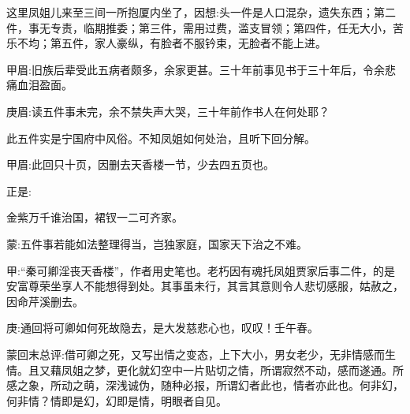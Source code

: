 \begin{parag}
    这里凤姐儿来至三间一所抱厦内坐了，因想:头一件是人口混杂，遗失东西；第二件，事无专责，临期推委；第三件，需用过费，滥支冒领；第四件，任无大小，苦乐不均；第五件，家人豪纵，有脸者不服钤束，无脸者不能上进。\begin{note}甲眉:旧族后辈受此五病者颇多，余家更甚。三十年前事见书于三十年后，令余悲痛血泪盈面。\end{note}\begin{note}庚眉:读五件事未完，余不禁失声大哭，三十年前作书人在何处耶？\end{note}此五件实是宁国府中风俗。不知凤姐如何处治，且听下回分解。\begin{note}甲眉:此回只十页，因删去天香楼一节，少去四五页也。\end{note}
\end{parag}


\begin{parag}
    正是:
\end{parag}


\begin{poem}
    \begin{pl} 金紫万千谁治国，裙钗一二可齐家。\end{pl}
    \begin{note}蒙:五件事若能如法整理得当，岂独家庭，国家天下治之不难。\end{note}
\end{poem}


\begin{parag}
    \begin{note}甲:“秦可卿淫丧天香楼”，作者用史笔也。老朽因有魂托凤姐贾家后事二件，的是安富尊荣坐享人不能想得到处。其事虽未行，其言其意则令人悲切感服，姑赦之，因命芹溪删去。\end{note}
\end{parag}


\begin{parag}
    \begin{note}庚:通回将可卿如何死故隐去，是大发慈悲心也，叹叹！壬午春。\end{note}
\end{parag}


\begin{parag}
    \begin{note}蒙回末总评:借可卿之死，又写出情之变态，上下大小，男女老少，无非情感而生情。且又藉凤姐之梦，更化就幻空中一片贴切之情，所谓寂然不动，感而遂通。所感之象，所动之萌，深浅诚伪，随种必报，所谓幻者此也，情者亦此也。何非幻，何非情？情即是幻，幻即是情，明眼者自见。\end{note}
\end{parag}

